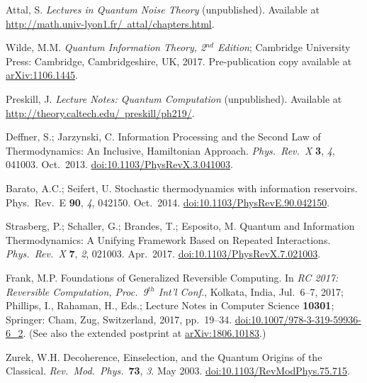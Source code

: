 \documentclass[preprints,article,accept,moreauthors,pdftex]{Definitions/mdpi}
\begin{document}
\begin{thebibliography}{999}
Attal, S\@. \emph{Lectures in Quantum Noise Theory} (unpublished). Available at \href{http://math.univ-lyon1.fr/~attal/chapters.html}{http://math.univ-lyon1.fr/~attal/chapters.html}.

Wilde, M.M\@. \emph{Quantum Information Theory, 2$^{nd}$ Edition}; Cambridge University Press: Cambridge, Cambridgeshire, UK, 2017. Pre-publication copy available at \href{https://arxiv.org/abs/1106.1445}{arXiv:1106.1445}.

Preskill, J\@. \emph{Lecture Notes: Quantum Computation} (unpublished). Available at \href{http://theory.caltech.edu/~preskill/ph219/}{http://theory.caltech.edu/~preskill/ph219/}.

Deffner, S.; Jarzynski, C\@. Information Processing and the Second Law of Thermodynamics: An Inclusive, Hamiltonian Approach. {\em Phys.\ Rev.\ X} {\bf 3}, {\em 4}, 041003. Oct.\ 2013. \href{https://doi.org/10.1103/PhysRevX.3.041003}{doi:10.1103/PhysRevX.3.041003}.

Barato, A.C.; Seifert, U\@. Stochastic thermodynamics with information reservoirs. {Phys.\ Rev.\ E} {\bf 90}, {\em 4}, 042150. Oct.\ 2014. \href{https://doi.org/10.1103/PhysRevE.90.042150}{doi:10.1103/PhysRevE.90.042150}.

Strasberg, P.; Schaller, G.; Brandes, T.; Esposito, M\@. Quantum and Information Thermodynamics: A Unifying Framework Based on Repeated Interactions. {\em Phys.\ Rev.\ X} {\bf 7}, {\em 2}, 021003. Apr.\ 2017. \href{https://doi.org/10.1103/PhysRevX.7.021003}{doi:10.1103/PhysRevX.7.021003}.

Frank, M.P\@. Foundations of Generalized Reversible Computing. In \emph{RC 2017: Reversible Computation, Proc.\ 9$^{th}$ Int'l Conf.}, Kolkata, India, Jul.\ 6--7, 2017; Phillips, I., Rahaman, H., Eds.; Lecture Notes in Computer Science {\bf 10301}; Springer: Cham, Zug, Switzerland, 2017, pp.~19--34. \href{https://doi.org/10.1007/978-3-319-59936-6_2}{doi:10.1007/978-3-319-59936-6\_2}. (See also the extended postprint at \href{https://arxiv.org/abs/1806.10183}{arXiv:1806.10183}.)

Zurek, W.H\@. Decoherence, Einselection, and the Quantum Origins of the Classical. {\em Rev.\ Mod.\ Phys.}\ {\bf 73}, {\em 3}. May 2003. \href{https://doi.org/10.1103/RevModPhys.75.715}{doi:10.1103/RevModPhys.75.715}.


\end{thebibliography}
\end{document}
